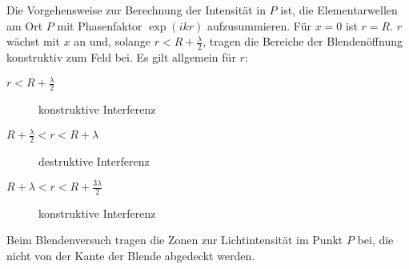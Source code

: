 Die Vorgehensweise zur Berechnung der Intensität in $P$ ist, die
Elementarwellen am Ort $P$ mit Phasenfaktor $\exp(ikr)$ aufzusummieren.
Für $x=0$ ist $r=R$. $r$ wächst mit $x$ an und, solange $r<R+\frac{\lambda}{2}$, tragen die
Bereiche der Blendenöffnung konstruktiv zum Feld bei.
Es gilt allgemein für $r$:
\begin{description}
\item[$r<R+\frac{\lambda}{2}$] konstruktive Interferenz
\item[$R+\frac{\lambda}{2}<r<R+\lambda$] destruktive Interferenz
\item[$R+\lambda<r<R+\frac{3\lambda}{2}$] konstruktive Interferenz
\end{description}

Beim Blendenversuch tragen die Zonen zur Lichtintensität im Punkt $P$
bei, die nicht von der Kante der Blende abgedeckt werden.

